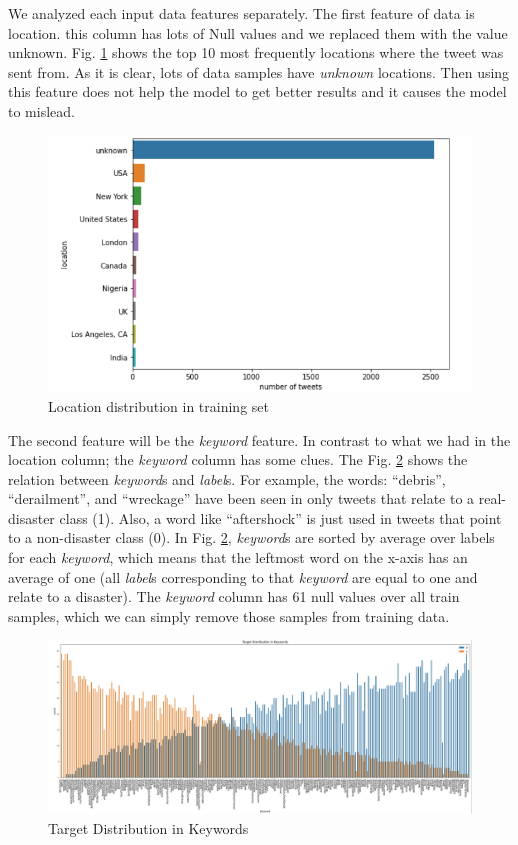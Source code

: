 \documentclass[sigconf]{acmart}
\begin{document}
We analyzed each input data features separately. The first feature of data is location. this column has lots of Null values and we replaced them with the value unknown. Fig. \ref{fig:locdist} shows the top 10 most frequently locations where the tweet was sent from. As it is clear, lots of data samples have \textit{unknown} locations. Then using this feature does not help the model to get better results and it causes the model to mislead. 
\begin{figure}[h]
  \centering
  \includegraphics[width=\linewidth]{loc.png}
  \caption{Location distribution in training set}
  \label{fig:locdist}
\end{figure}



The second feature will be the \textit{keyword} feature. In contrast to what we had in the location column; the \textit{keyword} column has some clues. The Fig. \ref{fig:keyword} shows the relation between \textit{keyword}s and \textit{label}s. For example, the words: “debris”, “derailment”, and “wreckage” have been seen in only tweets that relate to a real-disaster class (1). Also, a word like “aftershock” is just used in tweets that point to a non-disaster class (0). In Fig. \ref{fig:keyword}, \textit{keyword}s are sorted by average over labels for each \textit{keyword}, which means that the leftmost word on the x-axis has an average of one (all \textit{label}s corresponding to that \textit{keyword} are equal to one and relate to a disaster). The \textit{keyword} column has 61 null values over all train samples, which we can simply remove those samples from training data.
\begin{figure}[h]
  \centering
  \includegraphics[width=\linewidth]{keyword.png}
  \caption{Target Distribution in Keywords}
  \label{fig:keyword}
\end{figure}
\end{document}
